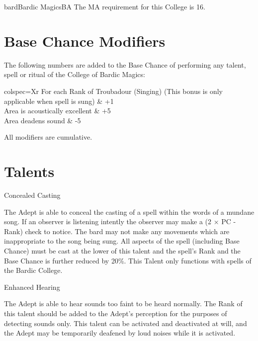 \begin{College}[2.1]{bard}{Bardic Magics}{BA}
The MA requirement for this College is 16. 

\section{Base Chance Modifiers}

The following numbers are added to the Base Chance of performing any
talent, spell or ritual of the College of Bardic Magics:

\begin{dqtblr}{colspec={Xr}}
For each Rank of Troubadour (Singing) (This bonus is only applicable when spell is sung)	& +1 \\
Area is acoustically excellent	& +5 \\
Area deadens sound		& -5 \\
\end{dqtblr}

All modifiers are cumulative. 

\section{Talents}

\begin{talent}[T-1]{Concealed Casting}

\begin{effects}
The Adept is able to conceal the casting of a spell within the words
of a mundane song.  If an observer is listening intently the observer
may make a (2 × PC - Rank) check to notice. The bard may not make any
movements which are inappropriate to the song being sung.  All aspects
of the spell (including Base Chance) must be cast at the lower of this
talent and the spell’s Rank and the Base Chance is further reduced by
20\%. This Talent only functions with spells of the Bardic College.
\end{effects}
\end{talent}

\begin{talent}[T-2]{Enhanced Hearing}

\begin{effects}
The Adept is able to hear sounds too faint to be heard normally.  The
Rank of this talent should be added to the Adept’s perception for the
purposes of detecting sounds only.  This talent can be activated and
deactivated at will, and the Adept may be temporarily deafened by loud
noises while it is activated.
\end{effects}
\end{talent}



\end{College}
